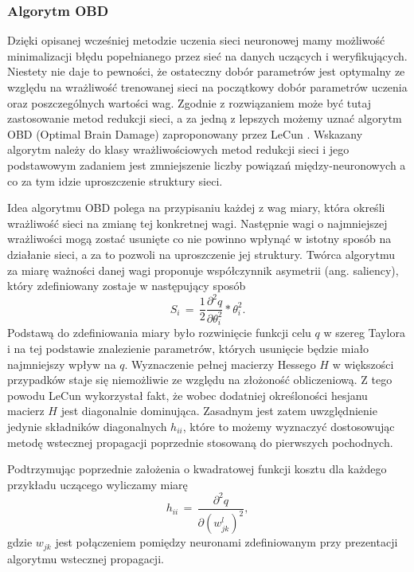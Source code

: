 \subsubsection{Algorytm OBD}
Dzięki opisanej wcześniej metodzie uczenia sieci neuronowej mamy możliwość minimalizacji błędu popełnianego przez sieć na danych uczących i weryfikujących. Niestety nie daje to pewności, że ostateczny dobór parametrów jest optymalny ze względu na wrażliwość trenowanej sieci na początkowy dobór parametrów uczenia oraz poszczególnych wartości wag. Zgodnie z \cite{osowski2013} rozwiązaniem może być tutaj zastosowanie metod redukcji sieci, a za jedną z lepszych możemy uznać algorytm OBD (Optimal Brain Damage) zaproponowany przez LeCun \cite{lecun1989}. Wskazany algorytm należy do klasy wrażliwościowych metod redukcji sieci i jego podstawowym zadaniem jest zmniejszenie liczby powiązań między-neuronowych a co za tym idzie uproszczenie struktury sieci. 
\par Idea algorytmu OBD polega na przypisaniu każdej z wag miary, która określi wrażliwość sieci na zmianę tej konkretnej wagi. Następnie wagi o najmniejszej wrażliwości mogą zostać usunięte co nie powinno wpłynąć w istotny sposób na działanie sieci, a za to pozwoli na uproszczenie jej struktury. Twórca algorytmu za miarę ważności danej wagi proponuje współczynnik asymetrii (ang. saliency), który zdefiniowany zostaje w następujący sposób
\begin{equation}
S_i \, = \, \frac{1}{2} \frac{\partial^2q}{\partial \theta_i^2} * \theta_i^2 .
\end{equation} 
Podstawą do zdefiniowania miary było rozwinięcie funkcji celu \(q\) w szereg Taylora i na tej podstawie znalezienie parametrów, których usunięcie będzie miało najmniejszy wpływ na  \(q\). Wyznaczenie pełnej macierzy Hessego \(H\) w większości przypadków staje się niemożliwie ze względu na złożoność obliczeniową. Z tego powodu LeCun wykorzystał fakt, że wobec dodatniej określoności hesjanu macierz \(H\) jest diagonalnie dominująca. Zasadnym jest zatem uwzględnienie jedynie składników diagonalnych \( h_{ii} \), które to możemy wyznaczyć dostosowując metodę wstecznej propagacji poprzednie stosowaną do pierwszych pochodnych. 
\par Podtrzymując poprzednie założenia o kwadratowej funkcji kosztu dla każdego przykładu uczącego wyliczamy miarę
\begin{equation}
h_{ii} \, = \, \frac{\partial^2q}{\partial (w_{jk}^l)^2}, 
\end{equation}  
gdzie \( w_{jk} \) jest połączeniem pomiędzy neuronami zdefiniowanym przy prezentacji algorytmu wstecznej propagacji.
